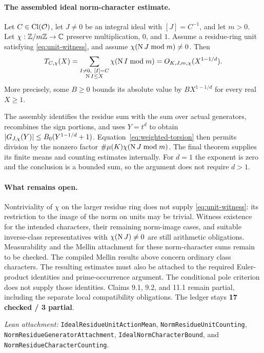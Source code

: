 \paragraph{The assembled ideal norm-character estimate.}
\begin{proposition}\label{prop:norm-character}
Let $C\in\operatorname{Cl}(\mathcal O)$, let $J\ne0$ be an integral ideal with $[J]=C^{-1}$,
and let $m>0$. Let $\chi:\mathbb Z/m\mathbb Z\to\mathbb C$ preserve multiplication,
$0$, and $1$. Assume a residue-ring unit satisfying
\eqref{eq:unit-witness}, and assume
$\chi(\operatorname N J\bmod m)\ne0$. Then
\[
 T_{C,\chi}(X)
 =\sum_{\substack{I\ne0,\ [I]=C\\\operatorname N I\leq X}}
       \chi(\operatorname N I\bmod m)
 =O_{K,J,m,\chi}(X^{1-1/d}).
\]
More precisely, some $B\geq0$ bounds its absolute value by
$BX^{1-1/d}$ for every real $X\geq1$.
\end{proposition}

The assembly identifies the residue sum with the sum over actual generators,
recombines the sign portions, and uses $Y=t^d$ to obtain
$\lvert G_{J,\chi}(Y)\rvert\leq B_0(Y^{1-1/d}+1)$.
Equation~\eqref{eq:weighted-torsion} then permits division by the nonzero
factor $\#\mu(K)\chi(\operatorname N J\bmod m)$.
The final theorem supplies its finite means and counting estimates internally.
For $d=1$ the exponent is zero and the conclusion is a bounded sum, so the
argument does not require $d>1$.

\paragraph{What remains open.}
Nontriviality of $\chi$ on the larger residue ring does not supply
\eqref{eq:unit-witness}: its restriction to the image of the norm on units
may be trivial. Witness existence for the intended characters, their
remaining norm-image cases, and suitable inverse-class representatives with
$\chi(\operatorname N J)\ne0$ are still arithmetic obligations.
Measurability and the Mellin attachment for these norm-character sums remain
to be checked. The compiled Mellin results above concern ordinary class characters.
The resulting estimates must also be attached to the required Euler-product
identities and prime-occurrence argument. The conditional pole criterion
does not supply those identities. Claims 9.1, 9.2, and 11.1 remain partial,
including the separate local compatibility obligations. The ledger stays
\textbf{17 checked / 3 partial}.

\smallskip
\noindent\emph{Lean attachment:}
\texttt{IdealResidueUnitActionMean}, \texttt{NormResidueUnitCounting},
\nolinkurl{NormResidueGeneratorAttachment}, \nolinkurl{IdealNormCharacterBound},
and \texttt{NormResidueCharacterCounting}.
